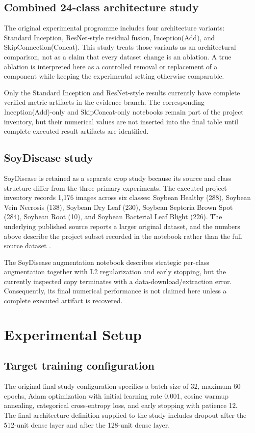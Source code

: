 \documentclass[a4paper,fleqn]{cas-dc}
\begin{document}
\subsection{Combined 24-class architecture study}
The original experimental programme includes four architecture variants: Standard Inception, ResNet-style residual fusion, Inception(Add), and SkipConnection(Concat). This study treats those variants as an architectural comparison, not as a claim that every dataset change is an ablation. A true ablation is interpreted here as a controlled removal or replacement of a component while keeping the experimental setting otherwise comparable.

Only the Standard Inception and ResNet-style results currently have complete verified metric artifacts in the evidence branch. The corresponding Inception(Add)-only and SkipConcat-only notebooks remain part of the project inventory, but their numerical values are not inserted into the final table until complete executed result artifacts are identified.

\subsection{SoyDisease study}
SoyDisease is retained as a separate crop study because its source and class structure differ from the three primary experiments. The executed project inventory records 1,176 images across six classes: Soybean Healthy (288), Soybean Vein Necrosis (138), Soybean Dry Leaf (230), Soybean Septoria Brown Spot (284), Soybean Root (10), and Soybean Bacterial Leaf Blight (226). The underlying published source reports a larger original dataset, and the numbers above describe the project subset recorded in the notebook rather than the full source dataset \citep{kotwal2024}.

The SoyDisease augmentation notebook describes strategic per-class augmentation together with L2 regularization and early stopping, but the currently inspected copy terminates with a data-download/extraction error. Consequently, its final numerical performance is not claimed here unless a complete executed artifact is recovered.

\section{Experimental Setup}
\subsection{Target training configuration}
The original final study configuration specifies a batch size of 32, maximum 60 epochs, Adam optimization with initial learning rate 0.001, cosine warmup annealing, categorical cross-entropy loss, and early stopping with patience 12. The final architecture definition supplied to the study includes dropout after the 512-unit dense layer and after the 128-unit dense layer.
\end{document}
